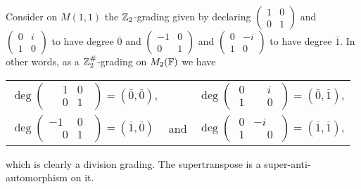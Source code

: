 \begin{ex}\label{ex:supertransp-graded}
    Consider on $M(1,1)$ the $\mathbb{Z}_2$-grading given by declaring $\begin{pmatrix}
       1 & 0 \\
       0 & 1
     \end{pmatrix}$ and
     $\begin{pmatrix}
       0 & i \\
       1 & 0
     \end{pmatrix}$ to have degree $\overline 0$ and
     $\begin{pmatrix}
       -1 & 0 \\
       0 & 1
     \end{pmatrix}$ and
     $\begin{pmatrix}
       0 & -i \\
       1 & 0
     \end{pmatrix}$ to have degree $\overline 1$. In other words, as a $\mathbb{Z}_2^\#$-grading on $M_2(\mathbb{F})$ we have\\
     \begin{center}
     \begin{tabular}{ l c r }
     $\deg \begin{pmatrix}
      \phantom{-}1 & 0\phantom{..} \\
      \phantom{-}0 & 1\phantom{..}
     \end{pmatrix} = (\bar 0, \bar 0)$, && $\deg \begin{pmatrix}
      \phantom{.}0 & \phantom{-}i\phantom{.} \\
      \phantom{.}1 & \phantom{-}0\phantom{.}
     \end{pmatrix} = (\bar 0, \bar 1)$,\\
     $\deg \begin{pmatrix}
      -1 & 0\phantom{..} \\
       \phantom{-}0 & 1\phantom{..}
     \end{pmatrix} = (\bar 1, \bar 0)$ &
     and
     & $\deg \begin{pmatrix}
      \phantom{.}0 & -i\phantom{.} \\
      \phantom{.}1 & \phantom{-}0\phantom{.}
     \end{pmatrix} = (\bar 1, \bar 1)$,
     \end{tabular}
     \end{center}
     which is clearly a division grading. The supertranspose is a super-anti-automorphism on it.
\end{ex}


